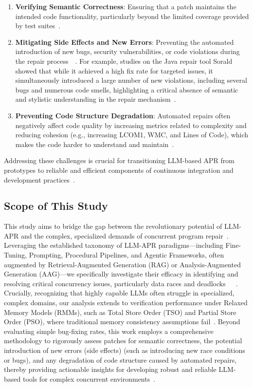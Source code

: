 \begin{enumerate}
    \item \textbf{Verifying Semantic Correctness}: Ensuring that a patch maintains the intended code functionality, particularly beyond the limited coverage provided by test suites~\cite{yang2025}.
    \item \textbf{Mitigating Side Effects and New Errors}: Preventing the automated introduction of new bugs, security vulnerabilities, or code violations during the repair process~\cite{yang2025}~\cite{liyanage2025}. For example, studies on the Java repair tool Sorald showed that while it achieved a high fix rate for targeted issues, it simultaneously introduced a large number of new violations, including several bugs and numerous code smells, highlighting a critical absence of semantic and stylistic understanding in the repair mechanism~\cite{liyanage2025}.
    \item \textbf{Preventing Code Structure Degradation}: Automated repairs often negatively affect code quality by increasing metrics related to complexity and reducing cohesion (e.g., increasing LCOM1, WMC, and Lines of Code), which makes the code harder to understand and maintain~\cite{liyanage2025}.
\end{enumerate}

Addressing these challenges is crucial for transitioning LLM-based APR from prototypes to reliable and efficient components of continuous integration and development practices~\cite{yang2025}.

\subsection{Scope of This Study}

This study aims to bridge the gap between the revolutionary potential of LLM-APR and the complex, specialized demands of concurrent program repair~\cite{jain2025}. Leveraging the established taxonomy of LLM-APR paradigms—including Fine-Tuning, Prompting, Procedural Pipelines, and Agentic Frameworks, often augmented by Retrieval-Augmented Generation (RAG) or Analysis-Augmented Generation (AAG)—we specifically investigate their efficacy in identifying and resolving critical concurrency issues, particularly data races and deadlocks~\cite{yang2025}~\cite{upadhyay2023}~\cite{kelk2013}. Crucially, recognizing that highly capable LLMs often struggle in specialized, complex domains, our analysis extends to verification performance under Relaxed Memory Models (RMMs), such as Total Store Order (TSO) and Partial Store Order (PSO), where traditional memory consistency assumptions fail~\cite{jain2025}. Beyond evaluating simple bug-fixing rates, this work employs a comprehensive methodology to rigorously assess patches for semantic correctness, the potential introduction of new errors (side effects) (such as introducing new race conditions or bugs), and any degradation of code structure caused by automated repairs, thereby providing actionable insights for developing robust and reliable LLM-based tools for complex concurrent environments~\cite{liyanage2025}.
